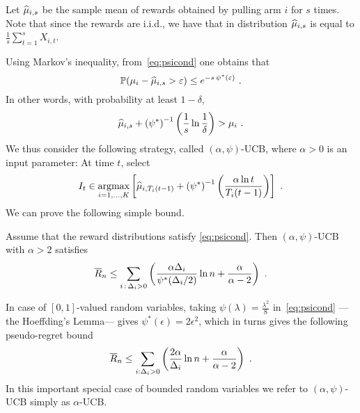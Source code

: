 Let $\widehat{\mu}_{i,s}$ be the sample mean of rewards obtained by pulling arm $i$ for $s$ times. Note that since the rewards are i.i.d., we have that in distribution $\widehat{\mu}_{i,s}$ is equal to $\frac{1}{s} \sum_{t=1}^s X_{i,t}$.

Using Markov's inequality, from~\eqref{eq:psicond} one obtains that
\begin{equation} \label{eq:psiconcentration}
\mathbb{P}(\mu_i - \widehat{\mu}_{i,s} > \varepsilon) \leq e^{- s\,\psi^*(\varepsilon)}~.
\end{equation}
In other words, with probability at least $1- \delta$,
$$\widehat{\mu}_{i,s} + \left(\psi^*\right)^{-1}\left( \frac{1}{s}\ln\frac{1}{\delta}\right) > \mu_i~.$$
We thus consider the following strategy, called $(\alpha, \psi)$-UCB, where $\alpha >0$ is an input parameter: At time $t$, select
\[
I_t \in \mathop{\mathrm{argmax}}_{i=1,\hdots,K} \left[ \widehat{\mu}_{i,T_i(t-1)} + \left(\psi^*\right)^{-1}\left( \frac{\alpha \ln t}{T_i(t-1)}\right) \right]~.
\]
We can prove the following simple bound.
%
\begin{theorem} \label{th:ucb}
Assume that the reward distributions satisfy \eqref{eq:psicond}. Then $(\alpha, \psi)$-UCB with $\alpha > 2$ satisfies
$$\overline{R}_n \leq \sum_{i \,:\, \Delta_i > 0} \left( \frac{\alpha \Delta_i}{\psi^*(\Delta_i / 2)} \ln n + \frac{\alpha}{\alpha - 2}  \right)~.$$
\end{theorem}
In case of $[0,1]$-valued random variables, taking $\psi(\lambda) = \tfrac{\lambda^2}{8}$ in~\eqref{eq:psicond} ---the Hoeffding's Lemma--- gives $\psi^*(\epsilon) = 2 \epsilon^2$, which in turns gives the following pseudo-regret bound
\begin{equation} \label{eq:regretUCBbounded}
\overline{R}_n \leq \sum_{i : \Delta_i > 0} \left( \frac{2 \alpha}{\Delta_i} \ln n + \frac{\alpha}{\alpha - 2}  \right)~.
\end{equation}
In this important special case of bounded random variables we refer to $(\alpha,\psi)$-UCB simply as $\alpha$-UCB.
%
